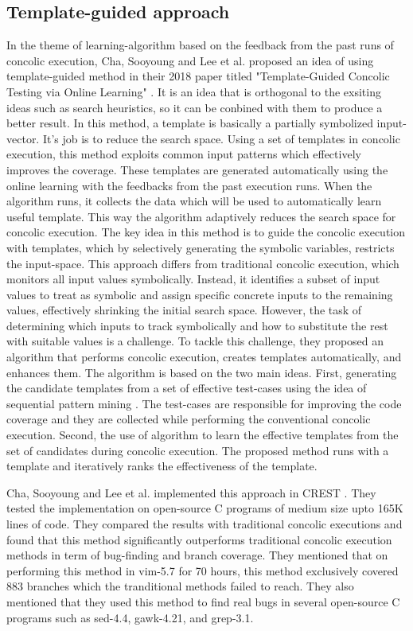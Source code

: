 \documentclass[	runningheads,
				a4paper]{llncs}
\begin{document}
\subsection{Template-guided approach}
In the theme of learning-algorithm based on the feedback from the past runs of concolic execution, Cha, Sooyoung and Lee et al. proposed an idea of using template-guided method in their 2018 paper titled "Template-Guided Concolic Testing via Online Learning" \cite{cha2018template}. It is an idea that is orthogonal to the exsiting ideas such as search heuristics, so it can be conbined with them to produce a better result. In this method, a template is basically a partially symbolized input-vector. It's job is to reduce the search space. 
Using a set of templates in concolic execution, this method exploits common input patterns which effectively improves the coverage.
These templates are generated automatically using the online learning with the feedbacks from the past execution runs. When the algorithm runs, it collects the data which will be used to automatically learn useful template. This way the algorithm adaptively reduces the search space for concolic execution. The key idea in this method is to guide the concolic execution with templates, which by selectively generating the symbolic variables, restricts the input-space. This approach differs from traditional concolic execution, which monitors all input values symbolically. Instead, it identifies a subset of input values to treat as symbolic and assign specific concrete inputs to the remaining values, effectively shrinking the initial search space. However, the task of determining which inputs to track symbolically and how to substitute the rest with suitable values is a challenge. To tackle this challenge, they proposed an algorithm that performs concolic execution, creates templates automatically, and enhances them. The algorithm is based on the two main ideas. First, generating the candidate templates from a set of effective test-cases using the idea of sequential pattern mining \cite{fumarola2016clofast}. The test-cases are responsible for improving the code coverage and they are collected while performing the conventional concolic execution. Second, the use of algorithm to learn the effective templates from the set of candidates during concolic execution. The proposed method runs with a template and iteratively ranks the effectiveness of the template. 

Cha, Sooyoung and Lee et al. implemented this approach \cite{cha2018template} in CREST \cite{kousik2008heuristic}. They tested the implementation on open-source C programs of medium size upto 165K lines of code. They compared the results with traditional concolic executions and found that this method significantly outperforms traditional concolic execution methods in term of bug-finding and branch coverage. They mentioned that on performing this method in vim-5.7 for 70 hours, this method exclusively covered 883 branches which the tranditional methods failed to reach. They also mentioned that they used this method to find real bugs in several open-source C programs such as sed-4.4, gawk-4.21, and grep-3.1.
\end{document}
